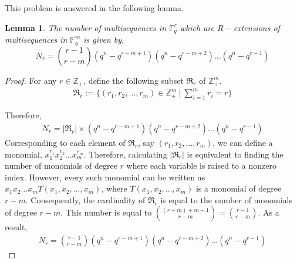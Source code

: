 \documentclass[letterpaper, 12 pt]{article}  \usepackage{amssymb}
\newtheorem{lemma}[theorem]{Lemma}
\newcommand{\F}{\mathbb{F}}
\begin{document}
This problem is answered in the following lemma.


\begin{lemma}
The number of multisequences in $\F_q^r$ which are $R-$extensions of
multisequences in $\F_q^m$ is given by,
\begin{equation}
 N_r = \binom {r-1}{r-m} (q^n-q^{r-m+1})(q^n - q^{r-m+2})\ldots(q^n -
q^{r-1})
\end{equation}
\end{lemma}

\begin{proof}
 For any $r \in \mathbb{Z}_+$, define the following subset $\mathfrak{R}_r $ of
$\mathbb{Z}_+^m$. 
\begin{eqnarray*}
\mathfrak{R}_r := \{(r_1,r_2,\ldots,r_m) \in \mathbb{Z}_+^m ~|~ \sum_{i=1}^mr_i
= r\}
\end{eqnarray*}

Therefore, 
\begin{eqnarray*}
 N_r = |\mathfrak{R}_r| \times (q^n-q^{r-m+1})(q^n - q^{r-m+2})\ldots(q^n -
q^{r-1})
\end{eqnarray*}
Corresponding to each element of $\mathfrak{R}_r $, say $(r_1,r_2,\ldots,r_m)$,
we can define a monomial, $x_1^{r_1}x_2^{r_2}\ldots x_m^{r_m}$. Therefore,
calculating  $|\mathfrak{R}_r|$ is equivalent to finding the number of monomials
of degree $r$ where each variable 
is raised to a nonzero index. However, every such monomial can be written as
$x_1x_2\ldots x_m \Upsilon(x_1,x_2,\ldots, x_m)$, where
$\Upsilon(x_1,x_2,\ldots, x_m)$ is a monomial of degree $r-m$. Consequently, the
cardinality of 
$\mathfrak{R}_r$ is equal to the number of monomials of degree $r-m$. This
number is equal to $\binom{(r-m)+m-1}{r-m} = \binom {r-1}{r-m}$. As a result, 
\begin{eqnarray*}
 N_r = \binom {r-1}{r-m}  (q^n-q^{r-m+1})(q^n - q^{r-m+2})\ldots(q^n -
q^{r-1})
\end{eqnarray*}
\end{proof}
\end{document}
